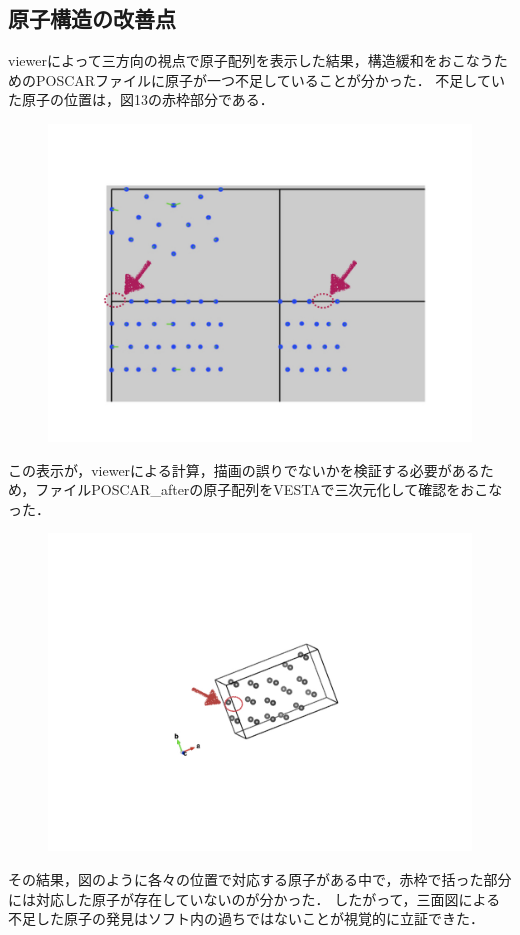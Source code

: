 \subsection{原子構造の改善点}
viewerによって三方向の視点で原子配列を表示した結果，構造緩和をおこなうためのPOSCARファイルに原子が一つ不足していることが分かった．
不足していた原子の位置は，図13の赤枠部分である．

\begin{figure}[htbp]\begin{center}
\includegraphics[width=12cm,bb= 0 0 937 753]{../figs/./boundary_narita.013.jpeg}
\caption{}
\label{default}\end{center}\end{figure}
この表示が，viewerによる計算，描画の誤りでないかを検証する必要があるため，ファイルPOSCAR\_afterの原子配列をVESTAで三次元化して確認をおこなった．

\begin{figure}[htbp]\begin{center}
\includegraphics[width=12cm,bb= 0 0 937 753]{../figs/./boundary_narita.018.jpeg}
\caption{}
\label{default}\end{center}\end{figure}
その結果，図のように各々の位置で対応する原子がある中で，赤枠で括った部分には対応した原子が存在していないのが分かった．
したがって，三面図による不足した原子の発見はソフト内の過ちではないことが視覚的に立証できた．

